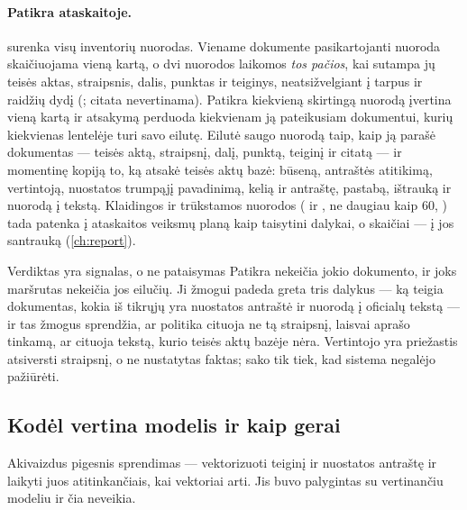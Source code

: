 \paragraph{Patikra ataskaitoje.}  surenka visų inventorių nuorodas.
Viename dokumente pasikartojanti nuoroda skaičiuojama vieną kartą, o dvi nuorodos laikomos
\emph{tos pačios}, kai sutampa jų teisės aktas, straipsnis, dalis, punktas ir teiginys,
neatsižvelgiant į tarpus ir raidžių dydį (; citata nevertinama).
Patikra kiekvieną skirtingą nuorodą įvertina vieną kartą ir atsakymą perduoda kiekvienam ją
pateikusiam dokumentui, kurių kiekvienas lentelėje  turi savo eilutę.
Eilutė saugo nuorodą taip, kaip ją parašė dokumentas --- teisės aktą, straipsnį, dalį,
punktą, teiginį ir citatą --- ir momentinę kopiją to, ką atsakė teisės aktų bazė: būseną,
antraštės atitikimą, vertintoją, nuostatos trumpąjį pavadinimą, kelią ir antraštę, pastabą,
ištrauką ir nuorodą į tekstą. Klaidingos ir trūkstamos nuorodos ( ir
, ne daugiau kaip 60, ) tada patenka į ataskaitos
veiksmų planą kaip taisytini dalykai, o skaičiai --- į jos santrauką (\cref{ch:report}).

\begin{humanbox}{Verdiktas yra signalas, o ne pataisymas}
Patikra nekeičia jokio dokumento, ir joks maršrutas nekeičia jos eilučių. Ji žmogui padeda
greta tris dalykus --- ką teigia dokumentas, kokia iš tikrųjų yra nuostatos antraštė ir nuorodą
į oficialų tekstą --- ir tas žmogus sprendžia, ar politika cituoja ne tą straipsnį, laisvai
aprašo tinkamą, ar cituoja tekstą, kurio teisės aktų bazėje nėra. Vertintojo 
yra priežastis atsiversti straipsnį, o ne nustatytas faktas;  sako tik
tiek, kad sistema negalėjo pažiūrėti.
\end{humanbox}

\subsection{Kodėl vertina modelis ir kaip gerai}\label{sec:company:measured}

Akivaizdus pigesnis sprendimas --- vektorizuoti teiginį ir nuostatos antraštę ir laikyti juos
atitinkančiais, kai vektoriai arti. Jis buvo palygintas su vertinančiu modeliu ir čia neveikia.


